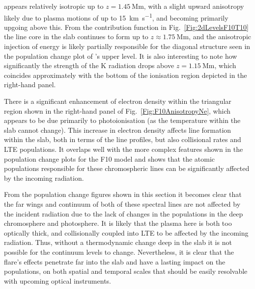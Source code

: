 \Ha{} appears relatively isotropic up to $z=\SI{1.45}{\mega\metre}$, with a slight upward anisotropy likely due to plasma motions of up to \SI{15}{\kilo\metre\per\second}, and becoming primarily upgoing above this.
From the contribution function in Fig.~\ref{Fig:2dLevelsF10T10} the \Ha{} line core in the slab continues to form up to $z\approx\SI{1.75}{\mega\metre}$, and the anisotropic injection of energy is likely partially responsible for the diagonal structure seen in the population change plot of \Ha{}'s upper level.
{ It is also interesting to note how significantly the strength of the \Caii{} K radiation drops above $z=\SI{1.15}{\mega\metre}$, which coincides approximately with the bottom of the ionisation region depicted in the right-hand panel.}

There is a significant enhancement of electron density within the triangular region shown in the right-hand panel of Fig.~\ref{Fig:F10AnisotropyNe}, which appears to be due primarily to photoionisation (as the temperature within the slab cannot change).
This increase in electron density affects line formation within the slab, both in terms of the line profiles, but also collisional rates and LTE populations.
It overlaps well with the more complex features shown in the population change plots for the F10 model and shows that the atomic populations responsible for these chromospheric lines can be significantly affected by the incoming radiation.

From the population change figures shown in this section it becomes clear that the far wings and continuum of both of these spectral lines are not affected by the incident radiation due to the lack of changes in the populations in the deep chromosphere and photosphere.
It is likely that the plasma here is both too optically thick, and collisionally coupled into LTE to be affected by the incoming radiation.
Thus, without a thermodynamic change deep in the slab it is not possible for the continuum levels to change.
Nevertheless, it is clear that the flare's effects penetrate far into the slab and have a lasting impact on the populations, on both spatial and temporal scales that should be easily resolvable with upcoming optical instruments.

